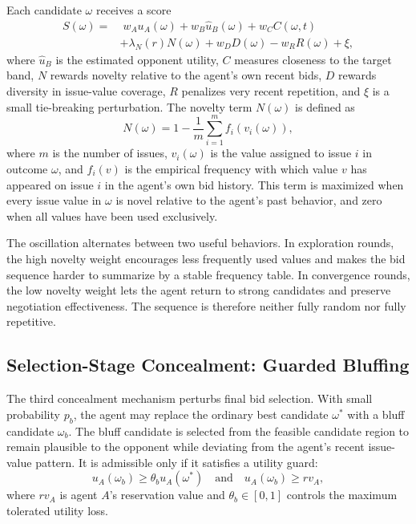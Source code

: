 \documentclass[runningheads]{llncs}
\begin{document}
Each candidate $\omega$ receives a score
\begin{align}
S(\omega) = &\; w_A u_A(\omega) + w_B \hat{u}_B(\omega)
+ w_C C(\omega,t) \nonumber\\
& + \lambda_N(r) N(\omega) + w_D D(\omega)
- w_R R(\omega) + \xi,
\label{eq:score}
\end{align}
where $\hat{u}_B$ is the estimated opponent utility, $C$ measures closeness to the target band, $N$ rewards novelty relative to the agent's own recent bids, $D$ rewards diversity in issue-value coverage, $R$ penalizes very recent repetition, and $\xi$ is a small tie-breaking perturbation. The novelty term $N(\omega)$ is defined as
\begin{equation}
N(\omega) = 1 - \frac{1}{m}\sum_{i=1}^{m} f_i(v_i(\omega)),
\label{eq:novelty_def}
\end{equation}
where $m$ is the number of issues, $v_i(\omega)$ is the value assigned to issue $i$ in outcome $\omega$, and $f_i(v)$ is the empirical frequency with which value $v$ has appeared on issue $i$ in the agent's own bid history. This term is maximized when every issue value in $\omega$ is novel relative to the agent's past behavior, and zero when all values have been used exclusively.

The oscillation alternates between two useful behaviors. In exploration rounds, the high novelty weight encourages less frequently used values and makes the bid sequence harder to summarize by a stable frequency table. In convergence rounds, the low novelty weight lets the agent return to strong candidates and preserve negotiation effectiveness. The sequence is therefore neither fully random nor fully repetitive.

\subsection{Selection-Stage Concealment: Guarded Bluffing}

The third concealment mechanism perturbs final bid selection. With small probability $p_b$, the agent may replace the ordinary best candidate $\omega^*$ with a bluff candidate $\omega_b$. The bluff candidate is selected from the feasible candidate region to remain plausible to the opponent while deviating from the agent's recent issue-value pattern. It is admissible only if it satisfies a utility guard:
\begin{equation}
 u_A(\omega_b) \geq \theta_b u_A(\omega^*)
 \quad \text{and} \quad
 u_A(\omega_b) \geq rv_A,
\label{eq:bluffguard}
\end{equation}
where $rv_A$ is agent $A$'s reservation value and $\theta_b\in[0,1]$ controls the maximum tolerated utility loss.
\end{document}
